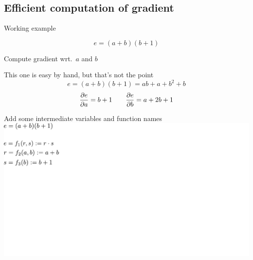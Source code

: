 \documentclass[12pt,aspectratio=169,handout]{beamer}
\begin{document}
\subsection{Efficient computation of gradient}

\begin{frame}{Working example}
	
	$$
	e = (a + b)(b + 1)
	$$
	
	Compute gradient wrt.\ $a$ and $b$
	
	\bigskip
	
	\pause
	
	\begin{block}{This one is easy by hand, but that's not the point}
		$$
		e = (a + b)(b + 1) = ab + a + b^2 + b
		$$
		$$
		\pdv{e}{a} = b + 1 \qquad \pdv{e}{b} = a + 2b + 1
		$$
	\end{block}
	
\end{frame}



\begin{frame}{Add some intermediate variables and function names}
	\includegraphics[width=1.1\linewidth]{img/backprop01.pdf}
\end{frame}
\end{document}
